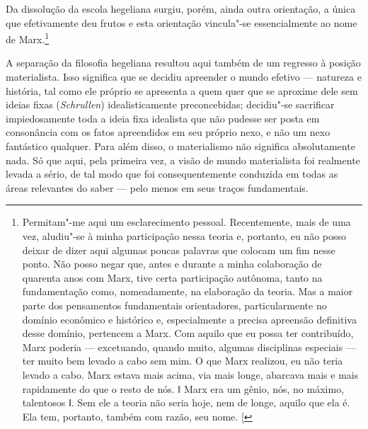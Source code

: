 Da dissolução da escola hegeliana surgiu, porém, ainda outra orientação,
a única que efetivamente deu frutos e esta orientação vincula"-se
essencialmente ao nome de Marx.\footnote{Permitam"-me aqui um esclarecimento pessoal. Recentemente, mais de uma vez, aludiu"-se à minha participação nessa teoria e, portanto, eu não posso deixar de dizer aqui algumas poucas palavras que colocam um fim
  nesse ponto. Não posso negar que, antes e durante a minha colaboração
  de quarenta anos com Marx, tive certa participação autônoma, tanto na
  fundamentação como, nomeadamente, na elaboração da teoria. Mas a maior
  parte dos pensamentos fundamentais orientadores, particularmente no
  domínio econômico e histórico e, especialmente a precisa apreensão
  definitiva desse domínio, pertencem a Marx. Com aquilo que eu possa
  ter contribuído, Marx poderia --- excetuando, quando muito, algumas
  disciplinas especiais --- ter muito bem levado a cabo sem mim. O que
  Marx realizou, eu não teria levado a cabo. Marx estava mais acima, via
  mais longe, abarcava mais e mais rapidamente do que o resto de nós. ǁ
  Marx era um gênio, nós, no máximo, talentosos ǁ. Sem ele a teoria não
  seria hoje, nem de longe, aquilo que ela é. Ela tem, portanto, também
  com razão, seu nome. {[}\versal{N.\,E.}{]}}

A separação da filosofia hegeliana resultou aqui também de um regresso à
posição materialista. Isso significa que se decidiu apreender o mundo
efetivo --- natureza e história, tal como ele próprio se apresenta a quem
quer que se aproxime dele sem ideias fixas (\emph{Schrullen})
idealisticamente preconcebidas; decidiu"-se sacrificar impiedosamente
toda a ideia fixa idealista que não pudesse ser posta em consonância com
os fatos apreendidos em seu próprio nexo, e não um nexo fantástico
qualquer. Para além disso, o materialismo não significa absolutamente
nada. Só que aqui, pela primeira vez, a visão de mundo materialista foi
realmente levada a sério, de tal modo que foi consequentemente conduzida
em todas as áreas relevantes do saber --- pelo menos em seus traços
fundamentais.

